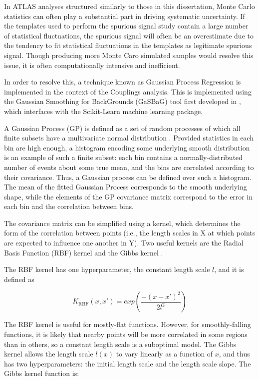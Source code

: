 In ATLAS analyses structured similarly to those in this dissertation, Monte Carlo statistics can often play a substantial part in driving systematic uncertainty. If the templates used to perform the spurious signal study contain a large number of statistical fluctuations, the spurious signal will often be an overestimate due to the tendency to fit statistical fluctuations in the templates as legitimate spurious signal. Though producing more Monte Caro simulated samples would resolve this issue, it is often computationally intensive and inefficient.

In order to resolve this, a technique known as Gaussian Process Regression is implemented in the context of the Couplings analysis. This is implemented using the Gaussian Smoothing for BackGrounds (GaSBaG) tool first developed in \cite{Hyneman}, which interfaces with the Scikit-Learn \cite{scikit-learn} machine learning package.

A Gaussian Process (GP) is defined as a set of random processes of which all finite subsets have a multivariate normal distribution \cite{ebden2015gaussian}. Provided statistics in each bin are high enough, a histogram encoding some underlying smooth distribution is an example of such a finite subset: each bin contains a normally-distributed number of events about some true mean, and the bins are correlated according to their covariance. Thus, a Gaussian process can be defined over such a histogram. The mean of the fitted Gaussian Process corresponds to the smooth underlying shape, while the elements of the GP covariance matrix correspond to the error in each bin and the correlation between bins.

The covariance matrix can be simplified using a kernel, which determines the form of the correlation between points (i.e., the length scales in X at which points are expected to influence one another in Y). Two useful kernels are the Radial Basis Function (RBF) kernel and the Gibbs kernel \cite{3569} \cite{Gibbs}. 

The RBF kernel has one hyperparameter, the constant length scale $l$, and it is defined as

\begin{equation}
K_\text{RBF}(x,x') = exp\left(\frac{-(x-x')^2}{2l^2}\right)
\end{equation}

The RBF kernel is useful for mostly-flat functions. However, for smoothly-falling functions, it is likely that nearby points will be more correlated in some regions than in others, so a constant length scale is a suboptimal model. The Gibbs kernel allows the length scale $l(x)$ to vary linearly as a function of $x$, and thus has two hyperparameters: the initial length scale and the length scale slope. The Gibbs kernel function is: 

